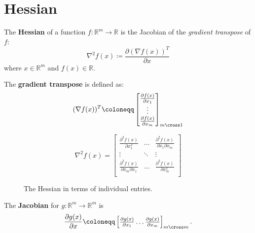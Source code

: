 \section{Hessian}
\begin{definition}
  The \textbf{Hessian} of a function \(f: \mathbb{R} ^m \to \mathbb{R} \) is the Jacobian of the \emph{gradient transpose} of \(f\):
  \[
    \nabla^2 f(x) \coloneqq \frac{\partial (\nabla f(x))^T}{\partial x} 
  \]
  where \(x \in \mathbb{R} ^m\) and \(f(x) \in \mathbb{R} \).
\end{definition}

\begin{definition}
  The \textbf{gradient transpose} is defined as:
  \[
    (\nabla f(x))^T \coloneqq
    \begin{bmatrix}
      \frac{\partial f(x)}{\partial x_1} \\
      \vdots \\
      \frac{\partial f(x)}{\partial x_m} \\
    \end{bmatrix}_{m \cross 1}
  \]
\end{definition}


\begin{figure}[h]
  \[
    \nabla^2 f(x) =
    \left[
      \begin{array}{ccc}
        \frac{\partial^2 f(x)}{\partial x_1^2} & \ldots & \frac{\partial^2 f(x)}{\partial x_1 \partial x_m} \\
        \vdots & \ddots & \vdots \\
        \frac{\partial^2 f(x)}{\partial x_m \partial x_1} & \ldots & \frac{\partial^2 f(x)}{\partial x_m^2} \\
      \end{array}
    \right] 
  \]
  \caption{The Hessian in terms of individual entries.}
\end{figure}

\newpage
    
The \textbf{Jacobian} for \(g: \mathbb{R} ^m \to \mathbb{R} ^m\) is
\[
  \frac{\partial g(x)}{\partial x} \coloneqq
  \begin{bmatrix}
    \frac{\partial g(x)}{\partial x_1} \ldots \frac{\partial g(x)}{\partial x_m} 
  \end{bmatrix}_{m \cross m}.
\]

